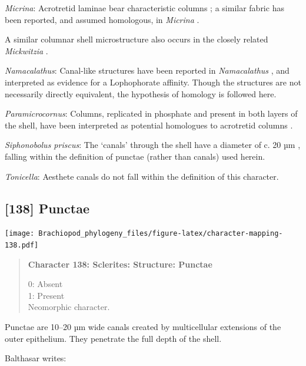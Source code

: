 \documentclass[openany]{book}
\begin{document}
\hypertarget{Micrina-coding-137}{}
\emph{Micrina}: Acrotretid laminae bear characteristic columns
\citep[e.g.][]{Zhang2016Epithelialcell}; a similar fabric has been
reported, and assumed homologous, in \emph{Micrina}
\citep{Butler2012ConstructingCambrian}.

A similar columnar shell microstructure also occurs in the closely
related \emph{Mickwitzia} \citep{Balthasar2008iMummpikia}.

\hypertarget{Namacalathus-coding-137}{}
\emph{Namacalathus}: Canal-like structures have been reported in
\emph{Namacalathus} \citep{Zhuravlev2015Ediacaranskeletal}, and
interpreted as evidence for a Lophophorate affinity. Though the
structures are not necessarily directly equivalent, the hypothesis of
homology is followed here.

\hypertarget{Paramicrocornus-coding-137}{}
\emph{Paramicrocornus}: Columns, replicated in phosphate and present in
both layers of the shell, have been interpreted as potential homologues
to acrotretid columns \citep{Zhang2018Ahyolithid}.

\hypertarget{Siphonobolus_priscus-coding-137}{}
\emph{Siphonobolus priscus}: The `canals' through the shell have a
diameter of c. 20 µm \citep[text-fig. 2a]{Williams2004Chemicostructure},
falling within the definition of punctae (rather than canals) used
herein.

\hypertarget{Tonicella-coding-137}{}
\emph{Tonicella}: Aesthete canals do not fall within the definition of
this character.

\subsection*{{[}138{]} Punctae}\label{punctae}

\texttt{[image: Brachiopod\_phylogeny\_files/figure-latex/character-mapping-138.pdf]}

\begin{quote}
\textbf{Character 138: Sclerites: Structure: Punctae}

0: Absent\\
1: Present\\
Neomorphic character.
\end{quote}

Punctae are 10--20 µm wide canals created by multicellular extensions of
the outer epithelium. They penetrate the full depth of the shell.

Balthasar \citeyearpar{Balthasar2008iMummpikia} writes:
\end{document}
